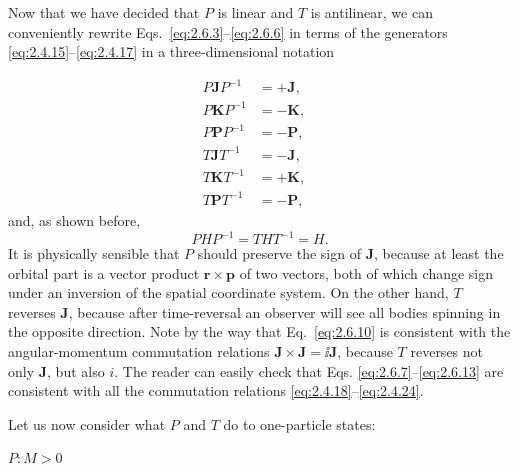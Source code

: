 \begin{sloppypar}
Now that we have decided that $P$ is linear and $T$ is antilinear, we can
conveniently rewrite Eqs.~\eqref{eq:2.6.3}--\eqref{eq:2.6.6} in terms of the generators
\eqref{eq:2.4.15}--\eqref{eq:2.4.17} in a three-dimensional notation
\end{sloppypar}
\begin{align}
P\mathbf{J}P^{-1}&=+\mathbf{J}, & \tag{2.6.7}\label{eq:2.6.7}\\
P\mathbf{K}P^{-1}&=-\mathbf{K}, & \tag{2.6.8}\label{eq:2.6.8}\\
P\mathbf{P}P^{-1}&=-\mathbf{P}, & \tag{2.6.9}\label{eq:2.6.9}\\
T\mathbf{J}T^{-1}&=-\mathbf{J}, & \tag{2.6.10}\label{eq:2.6.10}\\
T\mathbf{K}T^{-1}&=+\mathbf{K}, & \tag{2.6.11}\label{eq:2.6.11}\\
T\mathbf{P}T^{-1}&=-\mathbf{P}, & \tag{2.6.12}\label{eq:2.6.12}
\end{align}
and, as shown before,
\begin{equation}
PHP^{-1}=THT^{-1}=H.
\tag{2.6.13}\label{eq:2.6.13}
\end{equation}
It is physically sensible that $P$ should preserve the sign of $\mathbf{J}$,
because at least the orbital part is a vector product
$\mathbf{r}\times\mathbf{p}$ of two vectors, both of which change sign under
an inversion of the spatial coordinate system. On the other hand, $T$
reverses $\mathbf{J}$, because after time-reversal an observer will see all
bodies spinning in the opposite direction. Note by the way that Eq.~\eqref{eq:2.6.10}
is consistent with the angular-momentum commutation relations
$\mathbf{J}\times\mathbf{J}=\ii\mathbf{J}$, because $T$ reverses not only
$\mathbf{J}$, but also $i$. The reader can easily check that Eqs.
\eqref{eq:2.6.7}--\eqref{eq:2.6.13} are consistent with all the commutation relations
\eqref{eq:2.4.18}--\eqref{eq:2.4.24}.

Let us now consider what $P$ and $T$ do to one-particle states:

\medskip
\noindent\textbf{$P:M>0$}

